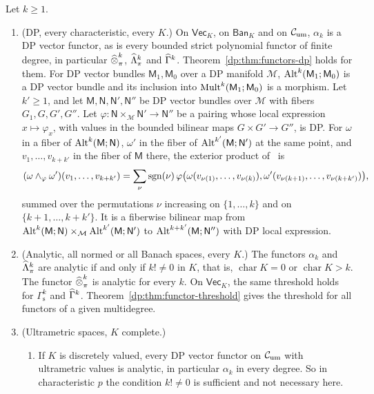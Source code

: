 \begin{theorem}\label{dp:thm:seven-eight-dp}
Let $k\ge1$.
\begin{enumerate}
\item \textup{(DP, every characteristic, every $K$.)} On $\mathsf{Vec}_K$, on $\mathsf{Ban}_K$ and on $\mathcal{C}_{\rm um}$, $\alpha_k$ is a DP vector functor, as is every bounded strict polynomial functor of finite degree, in particular $\mathbin{\widehat\otimes}^k_\pi$, $\widehat\Lambda^k_\pi$ and $\widehat\Gamma^k$. Theorem~\ref{dp:thm:functors-dp} holds for them. For DP vector bundles $\mathsf M_1,\mathsf M_0$ over a DP manifold $\mathcal M$, $\operatorname{Alt}^k(\mathsf M_1;\mathsf M_0)$ is a DP vector bundle and its inclusion into $\operatorname{Mult}^k(\mathsf M_1;\mathsf M_0)$ is a morphism. Let $k'\ge1$, and let $\mathsf M,\mathsf N,\mathsf N',\mathsf N''$ be DP vector bundles over $\mathcal M$ with fibers $G_1,G,G',G''$. Let $\varphi\colon\mathsf N\times_{\mathcal M}\mathsf N'\to\mathsf N''$ be a pairing whose local expression $x\mapsto\varphi_x$, with values in the bounded bilinear maps $G\times G'\to G''$, is DP. For $\omega$ in a fiber of $\operatorname{Alt}^k(\mathsf M;\mathsf N)$, $\omega'$ in the fiber of $\operatorname{Alt}^{k'}(\mathsf M;\mathsf N')$ at the same point, and $v_1,\dots,v_{k+k'}$ in the fiber of $\mathsf M$ there, the exterior product of~\cite[n\textsuperscript{o}~7.8.2]{Bou} is
\begin{equation}\label{dp:fn:eq:exterior}
 (\omega\wedge_\varphi\omega')(v_1,\dots,v_{k+k'})=\sum_\nu\operatorname{sgn}(\nu)\,\varphi\bigl(\omega(v_{\nu(1)},\dots,v_{\nu(k)}),\omega'(v_{\nu(k+1)},\dots,v_{\nu(k+k')})\bigr),
\end{equation}
summed over the permutations $\nu$ increasing on $\{1,\dots,k\}$ and on $\{k+1,\dots,k+k'\}$. It is a fiberwise bilinear map from $\operatorname{Alt}^k(\mathsf M;\mathsf N)\times_{\mathcal M}\operatorname{Alt}^{k'}(\mathsf M;\mathsf N')$ to $\operatorname{Alt}^{k+k'}(\mathsf M;\mathsf N'')$ with DP local expression.
\item \textup{(Analytic, all normed or all Banach spaces, every $K$.)} The functors $\alpha_k$ and $\widehat\Lambda^k_\pi$ are analytic if and only if $k!\ne0$ in $K$, that is, $\operatorname{char}K=0$ or $\operatorname{char}K>k$. The functor $\mathbin{\widehat\otimes}^k_\pi$ is analytic for every $k$. On $\mathsf{Vec}_K$, the same threshold holds for $\Gamma^k_{\mathrm s}$ and $\widehat\Gamma^k$. Theorem~\ref{dp:thm:functor-threshold} gives the threshold for all functors of a given multidegree.
\item \textup{(Ultrametric spaces, $K$ complete.)}
\begin{enumerate}
\item If $K$ is discretely valued, every DP vector functor on $\mathcal{C}_{\rm um}$ with ultrametric values is analytic, in particular $\alpha_k$ in every degree. So in characteristic $p$ the condition $k!\ne0$ is sufficient and not necessary here.

\end{enumerate}
\end{enumerate}
\end{theorem}
